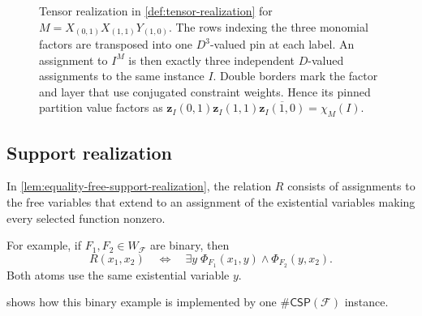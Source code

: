 \documentclass[11pt,letterpaper,onecolumn]{article}
\theoremstyle{plain}
\theoremstyle{definition}
\theoremstyle{remark}
\newcommand{\cF}{\mathcal F}
\newcommand{\CSP}[1]{\mathsf{\#CSP}(#1)}
\newcommand{\SuppRel}[1]{\Phi_{#1}}
\newcommand{\zvec}[1]{\mathbf z_{#1}}
\begin{document}
\begin{figure}[!t]
{%
  }
  \caption{Tensor realization in \cref{def:tensor-realization} for
  $M=X_{(0,1)}X_{(1,1)}Y_{(1,0)}$.  The rows indexing the three monomial factors
  are transposed into one $D^3$-valued pin at each label.  An assignment to
  $I^M$ is then exactly three independent $D$-valued assignments to the same
  instance $I$. Double borders mark the factor and layer that use
  conjugated constraint weights.
  Hence its pinned partition value factors as
  $\zvec I(0,1)\zvec I(1,1)\overline{\zvec I(1,0)}=\chi_M(I)$.}
  \label{fig:tensor-character-layers}
\end{figure}

\subsection{Support realization}
\label{app:support-realization-example}
In \cref{lem:equality-free-support-realization}, the relation $R$ consists of assignments to the free variables that extend
to an assignment of the existential variables making every selected
function nonzero.

For example, if $F_1,F_2\in W_{\cF}$ are binary, then
\[
  R(x_1,x_2)
  \quad\Longleftrightarrow\quad
  \exists y\;
  \SuppRel{F_1}(x_1,y)\wedge\SuppRel{F_2}(y,x_2).
\]
Both atoms use the same existential variable $y$.

 shows how this binary example
is implemented by one $\CSP{\cF}$ instance.
\end{document}
